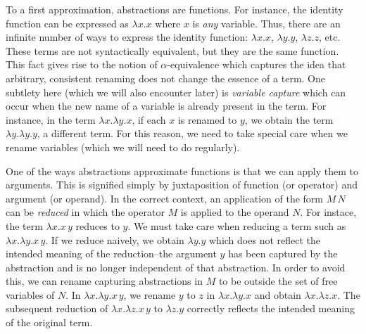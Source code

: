 \documentclass[ms,electronic,twosidetoc,letterpaper,chaptercenter,parttop]{byumsphd}
\begin{document}
To a first approximation, abstractions are functions. For instance, the identity function
can be expressed as $\lambda x.x$ where $x$ is \emph{any} variable. Thus, there are an
infinite number of ways to express the identity function: $\lambda x.x$, $\lambda y.y$,
$\lambda z.z$, etc. These terms are not syntactically equivalent, but they are the same
function. This fact gives rise to the notion of $\alpha$-equivalence which captures the
idea that arbitrary, consistent renaming does not change the essence of a term. One
subtlety here (which we will also encounter later) is \emph{variable capture} which can
occur when the new name of a variable is already present in the term. For instance, in the
term $\lambda x.\lambda y.x$, if each $x$ is renamed to $y$, we obtain the term $\lambda
y.\lambda y.y$, a different term. For this reason, we need to take special care when we
rename variables (which we will need to do regularly).

One of the ways abstractions approximate functions is that we can apply them to arguments.
This is signified simply by juxtaposition of function (or operator) and argument (or
operand). In the correct context, an application of the form $M\,N$ can be \emph{reduced}
in which the operator $M$ is applied to the operand $N$. For instace, the term $\lambda
x.x\,y$ reduces to $y$. We must take care when reducing a term such as $\lambda x.\lambda
y.x\,y$. If we reduce naively, we obtain $\lambda y.y$ which does not reflect the intended
meaning of the reduction--the argument $y$ has been captured by the abstraction and is no
longer independent of that abstraction. In order to avoid this, we can rename capturing
abstractions in $M$ to be outside the set of free variables of $N$. In $\lambda x.\lambda
y.x\,y$, we rename $y$ to $z$ in $\lambda x.\lambda y.x$ and obtain $\lambda x.\lambda
z.x$. The subsequent reduction of $\lambda x.\lambda z.x\,y$ to $\lambda z.y$ correctly
reflects the intended meaning of the original term.
\end{document}
